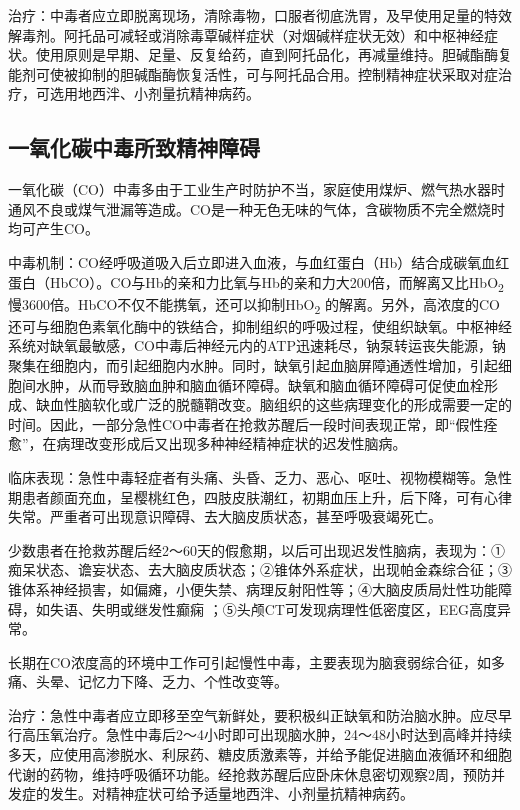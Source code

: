 治疗：中毒者应立即脱离现场，清除毒物，口服者彻底洗胃，及早使用足量的特效解毒剂。阿托品可减轻或消除毒覃碱样症状（对烟碱样症状无效）和中枢神经症状。使用原则是早期、足量、反复给药，直到阿托品化，再减量维持。胆碱酯酶复能剂可使被抑制的胆碱酯酶恢复活性，可与阿托品合用。控制精神症状采取对症治疗，可选用地西泮、小剂量抗精神病药。

\subsection{一氧化碳中毒所致精神障碍}

一氧化碳（CO）中毒多由于工业生产时防护不当，家庭使用煤炉、燃气热水器时通风不良或煤气泄漏等造成。CO是一种无色无味的气体，含碳物质不完全燃烧时均可产生CO。

中毒机制：CO经呼吸道吸入后立即进入血液，与血红蛋白（Hb）结合成碳氧血红蛋白（HbCO）。CO与Hb的亲和力比氧与Hb的亲和力大200倍，而解离又比HbO\textsubscript{2}
慢3600倍。HbCO不仅不能携氧，还可以抑制HbO\textsubscript{2}
的解离。另外，高浓度的CO还可与细胞色素氧化酶中的铁结合，抑制组织的呼吸过程，使组织缺氧。中枢神经系统对缺氧最敏感，CO中毒后神经元内的ATP迅速耗尽，钠泵转运丧失能源，钠聚集在细胞内，而引起细胞内水肿。同时，缺氧引起血脑屏障通透性增加，引起细胞间水肿，从而导致脑血肿和脑血循环障碍。缺氧和脑血循环障碍可促使血栓形成、缺血性脑软化或广泛的脱髓鞘改变。脑组织的这些病理变化的形成需要一定的时间。因此，一部分急性CO中毒者在抢救苏醒后一段时间表现正常，即“假性痊愈”，在病理改变形成后又出现多种神经精神症状的迟发性脑病。

临床表现：急性中毒轻症者有头痛、头昏、乏力、恶心、呕吐、视物模糊等。急性期患者颜面充血，呈樱桃红色，四肢皮肤潮红，初期血压上升，后下降，可有心律失常。严重者可出现意识障碍、去大脑皮质状态，甚至呼吸衰竭死亡。

少数患者在抢救苏醒后经2～60天的假愈期，以后可出现迟发性脑病，表现为：①痴呆状态、谵妄状态、去大脑皮质状态；②锥体外系症状，出现帕金森综合征；③锥体系神经损害，如偏瘫，小便失禁、病理反射阳性等；④大脑皮质局灶性功能障碍，如失语、失明或继发性癫痫
；⑤头颅CT可发现病理性低密度区，EEG高度异常。

长期在CO浓度高的环境中工作可引起慢性中毒，主要表现为脑衰弱综合征，如多痛、头晕、记忆力下降、乏力、个性改变等。

治疗：急性中毒者应立即移至空气新鲜处，要积极纠正缺氧和防治脑水肿。应尽早行高压氧治疗。急性中毒后2～4小时即可出现脑水肿，24～48小时达到高峰并持续多天，应使用高渗脱水、利尿药、糖皮质激素等，并给予能促进脑血液循环和细胞代谢的药物，维持呼吸循环功能。经抢救苏醒后应卧床休息密切观察2周，预防并发症的发生。对精神症状可给予适量地西泮、小剂量抗精神病药。

